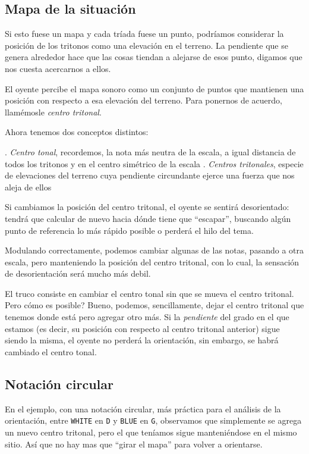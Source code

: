 \documentclass[]{article}
\begin{document}
\subsection{Mapa de la situación}

Si esto fuese un mapa y cada tríada fuese un punto, podríamos considerar la posición de los tritonos como una elevación en el terreno. La pendiente que se genera alrededor hace que las cosas tiendan a alejarse de esos punto, digamos que nos cuesta acercarnos a ellos.

El oyente percibe el mapa sonoro como un conjunto de puntos que mantienen una posición con respecto a esa elevación del terreno. Para ponernos de acuerdo, llamémosle \emph{centro tritonal}.

Ahora tenemos dos conceptos distintos:

. \emph{Centro tonal}, recordemos, la nota más neutra de la escala, a igual distancia de todos los tritonos y en el centro simétrico de la escala . \emph{Centros tritonales}, especie de elevaciones del terreno cuya pendiente circundante ejerce una fuerza que nos aleja de ellos

Si cambiamos la posición del centro tritonal, el oyente se sentirá desorientado: tendrá que calcular de nuevo hacia dónde tiene que ``escapar'', buscando algún punto de referencia lo más rápido posible o perderá el hilo del tema.

Modulando correctamente, podemos cambiar algunas de las notas, pasando a otra escala, pero manteniendo la posición del centro tritonal, con lo cual, la sensación de desorientación será mucho más debil.

El truco consiste en cambiar el centro tonal sin que se mueva el centro tritonal. Pero cómo es posible? Bueno, podemos, sencillamente, dejar el centro tritonal que tenemos donde está pero agregar otro más. Si la \emph{pendiente} del grado en el que estamos (es decir, su posición con respecto al centro tritonal anterior) sigue siendo la misma, el oyente no perderá la orientación, sin embargo, se habrá cambiado el centro tonal.

\subsection{Notación circular}

En el ejemplo, con una notación circular, más práctica para el análisis de la orientación, entre \texttt{WHITE} en \texttt{D} y \texttt{BLUE} en \texttt{G}, observamos que simplemente se agrega un nuevo centro tritonal, pero el que teníamos sigue manteniéndose en el mismo sitio. Así que no hay mas que ``girar el mapa'' para volver a orientarse.
\end{document}
